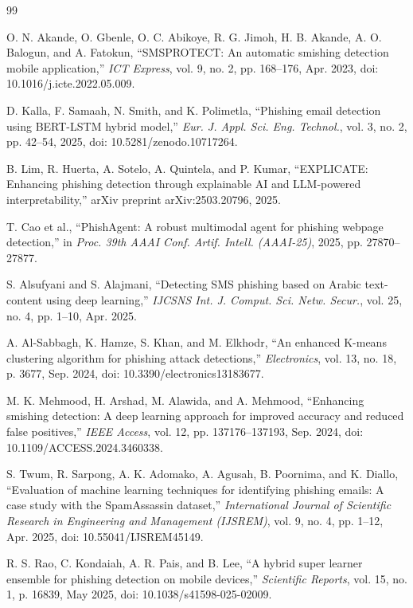 \documentclass[conference]{IEEEtran}
\begin{document}
\begin{thebibliography}{99}

 O. N. Akande, O. Gbenle, O. C. Abikoye, R. G. Jimoh, H. B. Akande, A. O. Balogun, and A. Fatokun, ``SMSPROTECT: An automatic smishing detection mobile application,'' \textit{ICT Express}, vol. 9, no. 2, pp. 168--176, Apr. 2023, doi: 10.1016/j.icte.2022.05.009.

 D. Kalla, F. Samaah, N. Smith, and K. Polimetla, ``Phishing email detection using BERT-LSTM hybrid model,'' \textit{Eur. J. Appl. Sci. Eng. Technol.}, vol. 3, no. 2, pp. 42--54, 2025, doi: 10.5281/zenodo.10717264.

 B. Lim, R. Huerta, A. Sotelo, A. Quintela, and P. Kumar, ``EXPLICATE: Enhancing phishing detection through explainable AI and LLM-powered interpretability,'' arXiv preprint arXiv:2503.20796, 2025.

 T. Cao et al., ``PhishAgent: A robust multimodal agent for phishing webpage detection,'' in \textit{Proc. 39th AAAI Conf. Artif. Intell. (AAAI-25)}, 2025, pp. 27870--27877.

 S. Alsufyani and S. Alajmani, ``Detecting SMS phishing based on Arabic text-content using deep learning,'' \textit{IJCSNS Int. J. Comput. Sci. Netw. Secur.}, vol. 25, no. 4, pp. 1--10, Apr. 2025.

 A. Al-Sabbagh, K. Hamze, S. Khan, and M. Elkhodr, ``An enhanced K-means clustering algorithm for phishing attack detections,'' \textit{Electronics}, vol. 13, no. 18, p. 3677, Sep. 2024, doi: 10.3390/electronics13183677.

 M. K. Mehmood, H. Arshad, M. Alawida, and A. Mehmood, ``Enhancing smishing detection: A deep learning approach for improved accuracy and reduced false positives,'' \textit{IEEE Access}, vol. 12, pp. 137176--137193, Sep. 2024, doi: 10.1109/ACCESS.2024.3460338.

 S. Twum, R. Sarpong, A. K. Adomako, A. Agusah, B. Poornima, and K. Diallo, ``Evaluation of machine learning techniques for identifying phishing emails: A case study with the SpamAssassin dataset,'' \textit{International Journal of Scientific Research in Engineering and Management (IJSREM)}, vol. 9, no. 4, pp. 1--12, Apr. 2025, doi: 10.55041/IJSREM45149.

 R. S. Rao, C. Kondaiah, A. R. Pais, and B. Lee, ``A hybrid super learner ensemble for phishing detection on mobile devices,'' \textit{Scientific Reports}, vol. 15, no. 1, p. 16839, May 2025, doi: 10.1038/s41598-025-02009.


\end{thebibliography}
\end{document}

